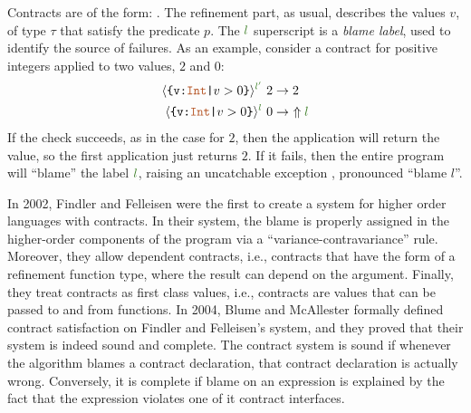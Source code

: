 Contracts are of the form:
.
The refinement part, as usual,  describes the values $v$, of type $\tau$
that satisfy the predicate $p$. 
The $\mklabel{l}$ superscript is a \textit{blame label}, used to
identify the source of failures.
%
As an example, 
consider a contract for positive integers 
applied to two values, $2$ and $0$: 
\begin{align*}
\trefpos{l'}\ 2 &\rightarrow	 2 \\
\trefpos{l}\ 0 &\rightarrow\ \elabel{l}
\end{align*}
%
If the check succeeds, as in the case for $2$,
then the application will return the value, so the first 
application just returns $2$.
If it fails, then the entire program will ``blame'' the label $\mklabel{l}$,
raising an uncatchable exception  , pronounced ``blame $l$''.

\begin{comment}
Assigning blame for contractual violations in higher-order languages
is complex:
%
The boundaries between cooperating components are more obscure 
than in the world with only first-order functions. 
A function may invoke a function passed to it at its call site.
Accordingly, the blame for a corresponding contract violation must 
lie with the supplier of the bad value, 
no matter if the bad value was passed by directly applying 
a function or by applying a base value.
%
\end{comment}
In 2002, Findler and Felleisen \cite{Findler02} were the first to
create a system for higher order languages with contracts.
%
In their system, the blame is properly assigned in the 
higher-order components of the program via a
``variance-contravariance'' rule.
Moreover,
they allow dependent contracts, i.e., 
contracts that have the form of a refinement function type, 
where the result can depend on the argument.
Finally,
they treat contracts as first class values, 
i.e., contracts are values that can be passed to and from functions.
%
In 2004, Blume and McAllester \cite{BlumeM06} 
formally defined contract satisfaction on Findler and Felleisen's system,
and they proved that their system is indeed
sound and complete.
%
The contract system is sound if whenever
the algorithm blames a contract declaration, 
that contract declaration is actually wrong.
%
Conversely, it is complete if blame on an expression is explained
by the fact that the expression violates one of it contract interfaces.

